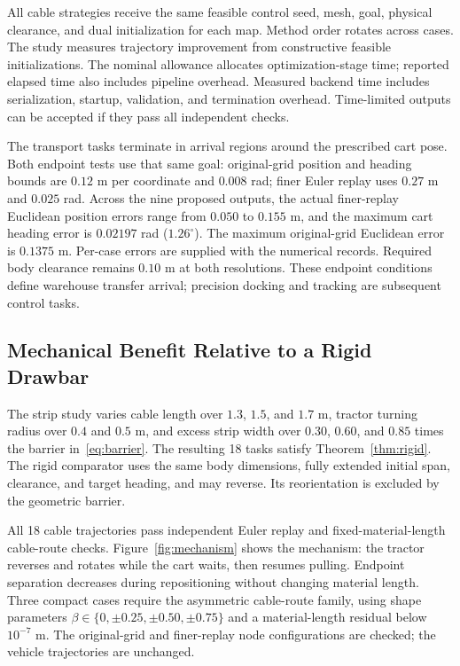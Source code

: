 All cable strategies receive the same feasible control seed, mesh, goal, physical clearance, and dual initialization for each map. Method order rotates across cases. The study measures trajectory improvement from constructive feasible initializations. The nominal allowance allocates optimization-stage time; reported elapsed time also includes pipeline overhead. Measured backend time includes serialization, startup, validation, and termination overhead. Time-limited outputs can be accepted if they pass all independent checks.

The transport tasks terminate in arrival regions around the prescribed cart pose. Both endpoint tests use that same goal: original-grid position and heading bounds are $0.12$ m per coordinate and $0.008$ rad; finer Euler replay uses $0.27$ m and $0.025$ rad. Across the nine proposed outputs, the actual finer-replay Euclidean position errors range from $0.050$ to $0.155$ m, and the maximum cart heading error is $0.02197$ rad ($1.26^\circ$). The maximum original-grid Euclidean error is $0.1375$ m. Per-case errors are supplied with the numerical records. Required body clearance remains $0.10$ m at both resolutions. These endpoint conditions define warehouse transfer arrival; precision docking and tracking are subsequent control tasks.

\subsection{Mechanical Benefit Relative to a Rigid Drawbar}
The strip study varies cable length over $1.3$, $1.5$, and $1.7$ m, tractor turning radius over $0.4$ and $0.5$ m, and excess strip width over $0.30$, $0.60$, and $0.85$ times the barrier in~\eqref{eq:barrier}. The resulting 18 tasks satisfy Theorem~\ref{thm:rigid}. The rigid comparator uses the same body dimensions, fully extended initial span, clearance, and target heading, and may reverse. Its reorientation is excluded by the geometric barrier.

All 18 cable trajectories pass independent Euler replay and fixed-material-length cable-route checks. Figure~\ref{fig:mechanism} shows the mechanism: the tractor reverses and rotates while the cart waits, then resumes pulling. Endpoint separation decreases during repositioning without changing material length. Three compact cases require the asymmetric cable-route family, using shape parameters $\beta\in\{0,\pm0.25,\pm0.50,\pm0.75\}$ and a material-length residual below $10^{-7}$ m. The original-grid and finer-replay node configurations are checked; the vehicle trajectories are unchanged.

